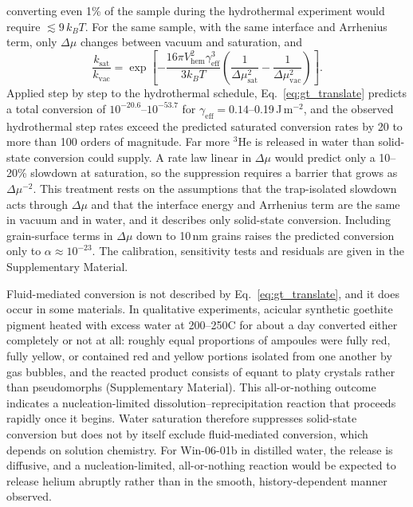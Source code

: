 converting even 1\% of the sample during the hydrothermal experiment would require
$\lesssim9\,k_BT$. For the same sample, with the same interface and Arrhenius term, only
$\Delta\mu$ changes between vacuum and saturation, and
\begin{equation}
  \frac{k_{\mathrm{sat}}}{k_{\mathrm{vac}}} = \exp\!\left[-\frac{16\pi V_{\mathrm{hem}}^{2}\gamma_{\mathrm{eff}}^{3}}{3k_BT}\left(\frac{1}{\Delta\mu_{\mathrm{sat}}^{2}} - \frac{1}{\Delta\mu_{\mathrm{vac}}^{2}}\right)\right].
  \label{eq:gt_translate}
\end{equation}
Applied step by step to the hydrothermal schedule, Eq.~\eqref{eq:gt_translate} predicts a total
conversion of $10^{-20.6}$--$10^{-53.7}$ for $\gamma_{\mathrm{eff}} = 0.14$--0.19\,J\,m$^{-2}$,
and the observed hydrothermal step rates exceed the predicted saturated conversion rates by 20 to
more than 100 orders of magnitude. Far more $^3$He is released in water than solid-state
conversion could supply. A rate law linear in $\Delta\mu$ would predict only a 10--20\% slowdown
at saturation, so the suppression requires a barrier that grows as $\Delta\mu^{-2}$. This
treatment rests on the assumptions that the trap-isolated slowdown acts through $\Delta\mu$ and
that the interface energy and Arrhenius term are the same in vacuum and in water, and it describes
only solid-state conversion. Including grain-surface terms in $\Delta\mu$ down to 10\,nm grains
raises the predicted conversion only to $\alpha\approx10^{-23}$. The calibration, sensitivity tests and residuals are given in the
Supplementary Material.

Fluid-mediated conversion is not described by Eq.~\eqref{eq:gt_translate}, and it does occur in
some materials. In qualitative experiments, acicular synthetic goethite pigment heated with excess
water at 200--250\textdegree C for about a day converted either completely or not at all:
roughly equal proportions of ampoules were fully red, fully yellow, or contained red and yellow
portions isolated from one another by gas bubbles, and the reacted product consists of equant
to platy crystals rather than pseudomorphs (Supplementary Material). This all-or-nothing outcome
indicates a nucleation-limited dissolution--reprecipitation reaction that proceeds rapidly once
it begins. Water saturation therefore suppresses solid-state conversion but does not by itself
exclude fluid-mediated conversion, which depends on solution chemistry. For Win-06-01b in
distilled water, the release is diffusive, and a nucleation-limited, all-or-nothing reaction
would be expected to release helium abruptly rather than in the smooth, history-dependent manner
observed.

